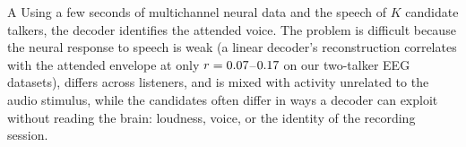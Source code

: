 \documentclass[twoside]{article}
\begin{document}
A Using a few seconds of multichannel neural data and the speech of $K$ candidate talkers, the decoder identifies the attended voice.
The problem is difficult because the neural response to speech is weak (a linear decoder's reconstruction correlates with the attended envelope at only $r=0.07$--$0.17$ on our two-talker EEG datasets),
differs across listeners, and is mixed with activity unrelated to the audio stimulus, while the
candidates often differ in ways a decoder can exploit without reading the brain: loudness,
voice, or the identity of the recording session.

\end{document}
